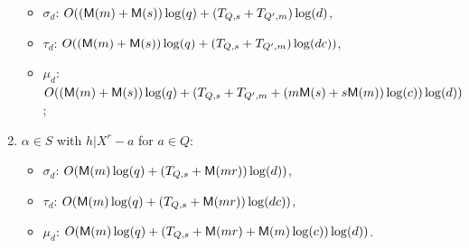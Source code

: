 \begin{proposition}
\begin{enumerate}[label=\textbf{Case~\theenumi.},leftmargin=*, align=left]
\begin{itemize}
\item
$\sigma_d$: $O((\mathsf{M}(m)+\mathsf{M}(s))\log(q) + (T_{Q,s}+T_{Q',m})\log(d)$,
\item
$\tau_d$: $O((\mathsf{M}(m)+\mathsf{M}(s))\log(q) + (T_{Q,s}+T_{Q',m})\log(d c))$,
\item
$\mu_d$: $O((\mathsf{M}(m)+\mathsf{M}(s))\log(q) + (T_{Q,s}+T_{Q',m} + (m\mathsf{M}(s)+s\mathsf{M}(m))\log(c))\log(d))$;
\end{itemize}
\item $\alpha \in S$ with $h | X^r - a$ for $a \in Q$:
\begin{itemize}
\item
$\sigma_d$: $O(\mathsf{M}(m)\log(q) + (T_{Q,s}+ \mathsf{M}(mr))\log(d))$,
\item
$\tau_d$: $O(\mathsf{M}(m)\log(q) + (T_{Q,s} + \mathsf{M}(mr))\log(d c))$,
\item
$\mu_d$: $O(\mathsf{M}(m)\log(q) + (T_{Q,s} + \mathsf{M}(mr) + \mathsf{M}(m)\log(c))\log(d))$.
\end{itemize}
\end{enumerate}
\end{proposition}

